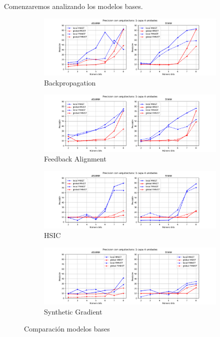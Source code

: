 Comenzaremos analizando los modelos bases.
\begin{figure}[H]
    \centering
    \begin{subfigure}[H]{0.475\textwidth} 
    \includegraphics[width=\textwidth]{imagenes/backprop/Precision con arquitectura: 1 capa 4 unidades.png}
    \caption{Backpropagation}
    \end{subfigure}
    \begin{subfigure}[H]{0.475\textwidth}
    \includegraphics[width=\textwidth]{imagenes/fa/Precision con arquitectura: 1 capa 4 unidades.png}
    \caption{Feedback Alignment}
    \end{subfigure}
    \begin{subfigure}[H]{0.475\textwidth}
    \includegraphics[width=\textwidth]{imagenes/HSIC/Precision con arquitectura: 1 capa 4 unidades.png}
    \caption{HSIC}
    \end{subfigure}
    \begin{subfigure}[H]{0.475\textwidth}
    \includegraphics[width=\textwidth]{imagenes/dni/Precision con arquitectura: 1 capa 4 unidades.png}
    \caption{Synthetic Gradient}
    \end{subfigure}
    \caption{Comparación modelos bases}
\end{figure}

